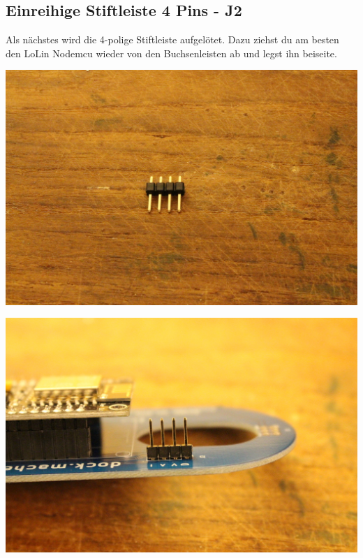 \documentclass{article}
\begin{document}
\subsection{Einreihige Stiftleiste 4 Pins - J2}

Als nächstes wird die 4-polige Stiftleiste aufgelötet. Dazu ziehst du am besten den LoLin Nodemcu wieder von den Buchsenleisten ab und legst ihn beiseite.

\vspace{1cm}

\begin{minipage}[b]{0.5\textwidth}
	\includegraphics[width=\textwidth]{Bilder2019/IMG_6473.JPG}
\end{minipage}
\begin{minipage}[b]{0.5\textwidth}
	\includegraphics[width=\textwidth]{Bilder2019/IMG_6474.JPG}
\end{minipage}
\end{document}

